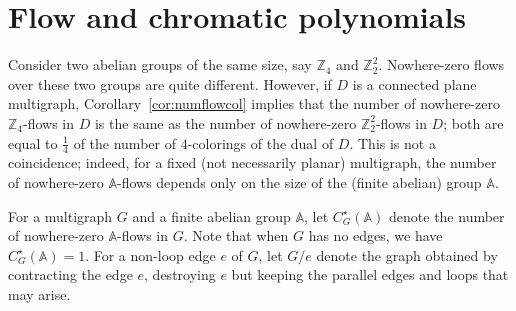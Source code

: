 \documentclass[12pt,twoside,openright,a4paper]{book}
\begin{document}
\section{Flow and chromatic polynomials}

Consider two abelian groups of the same size, say $\mathbb{Z}_4$ and $\mathbb{Z}_2^2$.  Nowhere-zero flows over these two groups
are quite different. However, if $D$ is a connected plane multigraph, Corollary~\ref{cor:numflowcol} implies that the number of
nowhere-zero $\mathbb{Z}_4$-flows in $D$ is the same as the number of nowhere-zero $\mathbb{Z}_2^2$-flows in $D$; both are equal
to $\tfrac{1}{4}$ of the number of $4$-colorings of the dual of $D$.  This is not a coincidence; indeed, for a fixed
(not necessarily planar) multigraph, the number of nowhere-zero $\mathbb{A}$-flows depends only on the size of the (finite abelian) group $\mathbb{A}$.

For a multigraph $G$ and a finite abelian group $\mathbb{A}$, let $C^\star_G(\mathbb{A})$ denote the number of nowhere-zero $\mathbb{A}$-flows in $G$.
Note that when $G$ has no edges, we have $C^\star_G(\mathbb{A})=1$.
For a non-loop edge $e$ of $G$, let $G/e$ denote the graph obtained by contracting the edge $e$, destroying $e$ but keeping the parallel edges and loops
that may arise.
\end{document}
